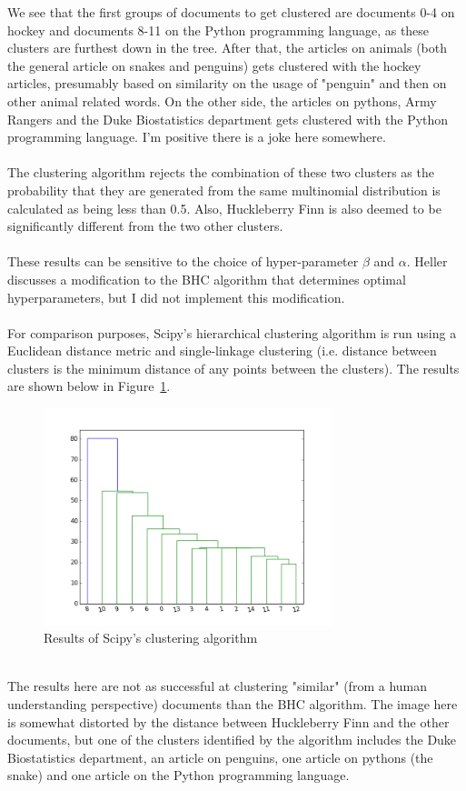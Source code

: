 \documentclass{article}
\begin{document}
We see that the first groups of documents to get clustered are documents 0-4 on hockey and documents 8-11 on the Python programming language, as these clusters are furthest down in the tree.  After that, the articles on animals (both the general article on snakes and penguins) gets clustered with the hockey articles, presumably based on similarity on the usage of "penguin" and then on other animal related words.  On the other side, the articles on pythons, Army Rangers and the Duke Biostatistics department gets clustered with the Python programming language.  I'm positive there is a joke here somewhere.  
\\
\\
The clustering algorithm rejects the combination of these two clusters as the probability that they are generated from the same multinomial distribution is calculated as being less than 0.5.  Also, Huckleberry Finn is also deemed to be significantly different from the two other clusters.
\\
\\
These results can be sensitive to the choice of hyper-parameter $\beta$ and $\alpha$.  Heller discusses a modification to the BHC algorithm that determines optimal hyperparameters, but I did not implement this modification.
\\
\\
For comparison purposes, Scipy's hierarchical clustering algorithm is run using a Euclidean distance metric and single-linkage clustering (i.e. distance between clusters is the minimum distance of any points between the clusters).  The results are shown below in Figure~\ref{fig:Scipy}.
\begin{figure}[h!]
\centering
\includegraphics[width=0.75\textwidth]{scipy_cluster.png}
\caption{Results of Scipy's clustering algorithm}
\label{fig:Scipy}
\end{figure}
\\
The results here are not as successful at clustering "similar" (from a human understanding perspective) documents than the BHC algorithm.  The image here is somewhat distorted by the distance between Huckleberry Finn and the other documents, but one of the clusters identified by the algorithm includes the Duke Biostatistics department, an article on penguins, one article on pythons (the snake) and one article on the Python programming language.
\end{document}
